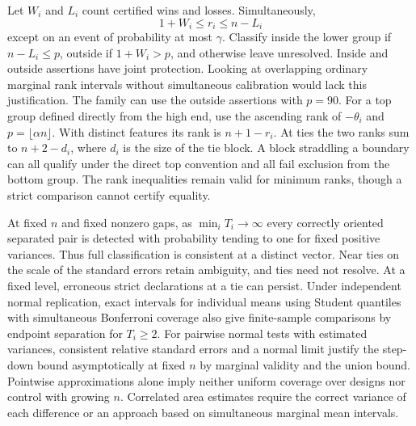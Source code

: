 \documentclass[11pt]{article}
\begin{document}
Let $W_i$ and $L_i$ count certified wins and losses. Simultaneously,
\[
 1+W_i\le r_i\le n-L_i
\]
except on an event of probability at most $\gamma$. Classify inside the lower group if $n-L_i\le p$, outside if $1+W_i>p$, and otherwise leave unresolved. Inside and outside assertions have joint protection. Looking at overlapping ordinary marginal rank intervals without simultaneous calibration would lack this justification. The family can use the outside assertions with $p=90$. For a top group defined directly from the high end, use the ascending rank of $-\theta_i$ and $p=\lfloor\alpha n\rfloor$. With distinct features its rank is $n+1-r_i$. At ties the two ranks sum to $n+2-d_i$, where $d_i$ is the size of the tie block. A block straddling a boundary can all qualify under the direct top convention and all fail exclusion from the bottom group. The rank inequalities remain valid for minimum ranks, though a strict comparison cannot certify equality.

At fixed $n$ and fixed nonzero gaps, as $\min_iT_i\to\infty$ every correctly oriented separated pair is detected with probability tending to one for fixed positive variances. Thus full classification is consistent at a distinct vector. Near ties on the scale of the standard errors retain ambiguity, and ties need not resolve. At a fixed level, erroneous strict declarations at a tie can persist. Under independent normal replication, exact intervals for individual means using Student quantiles with simultaneous Bonferroni coverage also give finite-sample comparisons by endpoint separation for $T_i\ge2$. For pairwise normal tests with estimated variances, consistent relative standard errors and a normal limit justify the step-down bound asymptotically at fixed $n$ by marginal validity and the union bound. Pointwise approximations alone imply neither uniform coverage over designs nor control with growing $n$. Correlated area estimates require the correct variance of each difference or an approach based on simultaneous marginal mean intervals.
\end{document}
